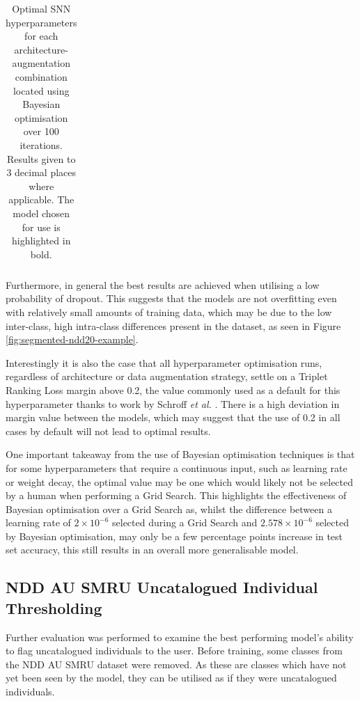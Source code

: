 \begin{table}[!t]
{\begin{tabular}{ccccccccccccc}
			\bottomrule                                                      
	\end{tabular}}
	\caption[Optimal SNN hyperparameters for each architecture-augmentation combination located using Bayesian optimisation over 100 iterations.]{Optimal SNN hyperparameters for each architecture-augmentation combination located using Bayesian optimisation over 100 iterations. Results given to 3 decimal places where applicable. The model chosen for use is highlighted in bold.}
	\label{tab:optunaBestParamsPerSNN}
\end{table}

 Furthermore, in general the best results are achieved when utilising a low probability of dropout. This suggests that the models are not overfitting even with relatively small amounts of training data, which may be due to the low inter-class, high intra-class differences present in the dataset, as seen in Figure \ref{fig:segmented-ndd20-example}.
 
 Interestingly it is also the case that all hyperparameter optimisation runs, regardless of architecture or data augmentation strategy, settle on a Triplet Ranking Loss margin above 0.2, the value commonly used as a default for this hyperparameter thanks to work by Schroff \textit{et al.} \cite{schroff_facenet_2015}. There is a high deviation in margin value between the models, which may suggest that the use of 0.2 in all cases by default will not lead to optimal results.
 
 One important takeaway from the use of Bayesian optimisation techniques is that for some hyperparameters that require a continuous input, such as learning rate or weight decay, the optimal value may be one which would likely not be selected by a human when performing a Grid Search. This highlights the effectiveness of Bayesian optimisation over a Grid Search as, whilst the difference between a learning rate of $2\times10^{-6}$ selected during a Grid Search and $2.578\times10^{-6}$ selected by Bayesian optimisation, may only be a few percentage points increase in test set accuracy, this still results in an overall more generalisable model. 
 
\subsection{NDD AU SMRU Uncatalogued Individual Thresholding}\label{ch:ID,sec:ModelSelection,subsec:UncataloguedIndividualThresholding}

Further evaluation was performed to examine the best performing model's ability to flag uncatalogued individuals to the user. Before training, some classes from the NDD AU SMRU dataset were removed. As these are classes which have not yet been seen by the model, they can be utilised as if they were uncatalogued individuals.

